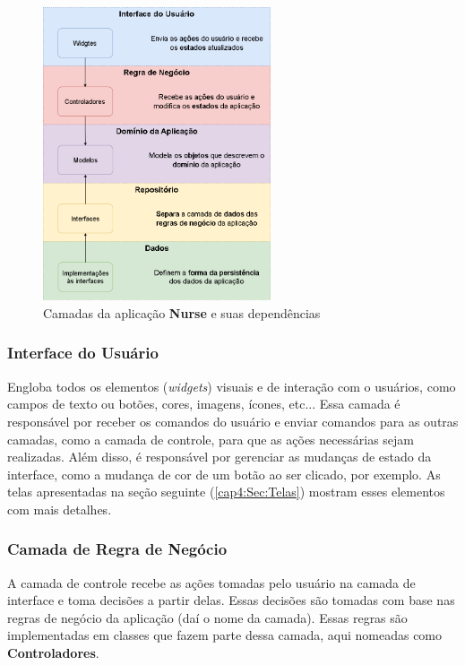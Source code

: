 \begin{figure}[!ht]
  \centering
  \includegraphics[width=0.6\textwidth]{figuras/cap4/4_1_1_camadas_nurse.png}
  \caption{Camadas da aplicação \textbf{Nurse} e suas dependências}
  \label{fig:4_1_1_camadas_nurse}
\end{figure}

\subsubsection{Interface do Usuário}
\label{cap4:SubSubSec:UI}
Engloba todos os elementos (\textit{widgets}) visuais e de interação com o usuários, como campos de texto ou botões, cores, imagens, ícones, etc... Essa camada é responsável por receber os comandos do usuário e enviar comandos para as outras camadas, como a camada de controle, para que as ações necessárias sejam realizadas. Além disso, é responsável por gerenciar as mudanças de estado da interface, como a mudança de cor de um botão ao ser clicado, por exemplo. As telas apresentadas na seção seguinte (\ref{cap4:Sec:Telas}) mostram esses elementos com mais detalhes.

\subsubsection{Camada de Regra de Negócio}
\label{cap4:SubSubSec:RegraNegocio}
A camada de controle recebe as ações tomadas pelo usuário na camada de interface e toma decisões a partir delas. Essas decisões são tomadas com base nas regras de negócio da aplicação (daí o nome da camada). Essas regras são implementadas em classes que fazem parte dessa camada, aqui nomeadas como \textbf{Controladores}.

